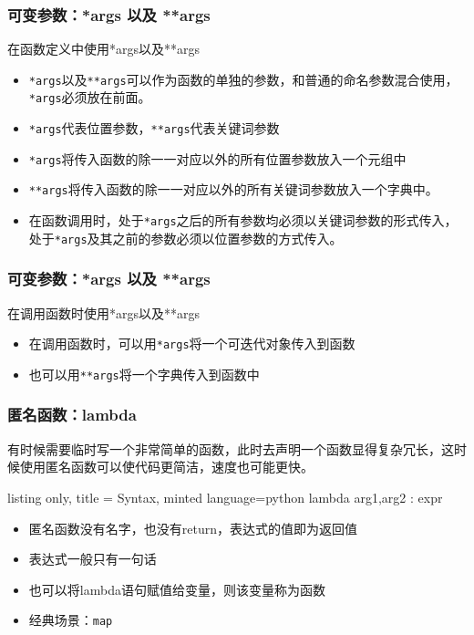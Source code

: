 \documentclass[10pt]{beamer}
\begin{document}
\begin{frame}
    \frametitle{可变参数：*args 以及 **args}

    \begin{block}{在函数定义中使用*args以及**args}
     \begin{itemize}
        \item \texttt{*args}以及\texttt{**args}可以作为函数的单独的参数，和普通的命名参数混合使用，\texttt{*args}必须放在前面。
        \item \texttt{*args}代表位置参数，\texttt{**args}代表关键词参数
        \item \texttt{*args}将传入函数的除一一对应以外的所有位置参数放入一个元组中
        \item \texttt{**args}将传入函数的除一一对应以外的所有关键词参数放入一个字典中。
        \item 在函数调用时，处于\texttt{*args}之后的所有参数均必须以关键词参数的形式传入，处于\texttt{*args}及其之前的参数必须以位置参数的方式传入。
     \end{itemize}
    \end{block}
    

\end{frame}

\begin{frame}
    \frametitle{可变参数：*args 以及 **args}

    \begin{block}{在调用函数时使用*args以及**args}
        \begin{itemize}
            \item 在调用函数时，可以用\texttt{*args}将一个可迭代对象传入到函数
            \item 也可以用\texttt{**args}将一个字典传入到函数中
        \end{itemize}
    \end{block}
    

\end{frame}

\begin{frame}[fragile]
    \frametitle{匿名函数：lambda}

    有时候需要临时写一个非常简单的函数，此时去声明一个函数显得复杂冗长，这时候使用匿名函数可以使代码更简洁，速度也可能更快。

    \begin{tcblisting}{listing only, title = Syntax, minted language=python}
lambda arg1,arg2 : expr\end{tcblisting}

\begin{itemize}
    \item 匿名函数没有名字，也没有return，表达式的值即为返回值
    \item 表达式一般只有一句话
    \item 也可以将lambda语句赋值给变量，则该变量称为函数
    \item 经典场景：\texttt{map}
\end{itemize}
\end{frame}
\end{document}
